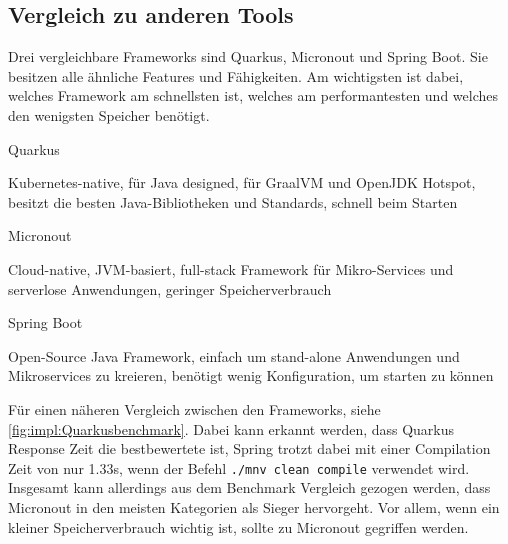 \subsection{Vergleich zu anderen Tools}
Drei vergleichbare Frameworks sind Quarkus, Micronout und Spring Boot. Sie besitzen alle ähnliche Features und Fähigkeiten.
Am wichtigsten ist dabei, welches Framework  am schnellsten ist, welches am performantesten und welches  den wenigsten Speicher benötigt.
\cite{Micr/QuarBenchmark}
 
\begin{compactitem}
    \item[Quarkus]
    \item Kubernetes-native, für Java designed, für GraalVM und OpenJDK Hotspot, besitzt die besten Java-Bibliotheken und Standards, schnell beim Starten
    \item[Micronout]
    \item Cloud-native, JVM-basiert, full-stack Framework für Mikro-Services und serverlose Anwendungen, geringer Speicherverbrauch
    \item[Spring Boot]
    \item Open-Source Java Framework, einfach um stand-alone Anwendungen und Mikroservices zu kreieren, benötigt wenig Konfiguration, um starten zu können
\end{compactitem}
\cite{Micr/QuarBenchmark}
 
Für einen näheren Vergleich zwischen den Frameworks, siehe \ref{fig:impl:Quarkusbenchmark}. Dabei kann erkannt werden, dass Quarkus Response Zeit die bestbewertete ist, Spring trotzt dabei mit einer Compilation Zeit von nur 1.33s, wenn der Befehl \texttt{./mnv clean compile} verwendet wird. Insgesamt kann allerdings aus dem Benchmark Vergleich gezogen werden, dass Micronout in den meisten Kategorien als Sieger hervorgeht. Vor allem, wenn ein kleiner Speicherverbrauch wichtig ist, sollte zu Micronout gegriffen werden. \cite{MicrVSQuarVSSprin}
 
